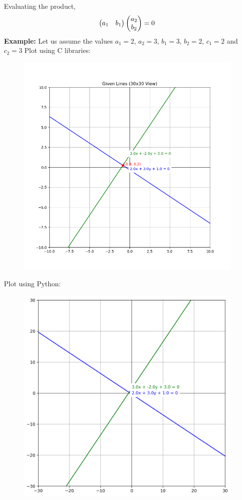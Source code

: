 \documentclass{beamer}
\numberwithin{equation}{section}
\begin{document}
Evaluating the product,
\begin{align}
    \begin{pmatrix}a_1 & b_1\end{pmatrix}\begin{pmatrix}a_2 \\ b_2\end{pmatrix}=0 
\end{align}
\textbf{Example:}
Let us assume the values $a_1=2$, $a_2=3$, $b_1=3$, $b_2=2$, $c_1=2$ and $c_2=3$
Plot using C libraries:
\begin{figure}[H]
	\centering
	\includegraphics[scale=0.5]{img}
	\caption*{}
	\label{img1}
\end{figure}
Plot using Python:
\begin{figure}[H]
	\centering
	\includegraphics[scale=0.5]{img1}
	\caption*{}
	\label{img2}
\end{figure}
\end{document}
